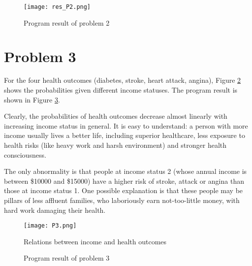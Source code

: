 \documentclass[12pt]{article}
\begin{document}
\begin{figure}[H]
    \centering
    \texttt{[image: res\_P2.png]}
    \caption{Program result of problem 2}
    \label{res_P2}
\end{figure}

\section{Problem 3}
For the four health outcomes (diabetes, stroke, heart attack, angina), Figure \ref{P3_figure} shows the probabilities given different income statuses. The program result is shown in Figure \ref{res_P3}.\par
Clearly, the probabilities of health outcomes decrease almost linearly with increasing income status in general. It is easy to understand: a person with more income usually lives a better life, including superior healthcare, less exposure to health risks (like heavy work and harsh environment) and stronger health consciousness.\par
The only abnormality is that people at income status 2 (whose annual income is between \$10000 and \$15000) have a higher risk of stroke, attack or angina than those at income status 1. One possible explanation is that these people may be pillars of less affluent families, who laboriously earn not-too-little money, with hard work damaging their health.
\begin{figure}
    \centering
    \texttt{[image: P3.png]}
    \caption{Relations between income and health outcomes}
    \label{P3_figure}
\end{figure}
\begin{figure}
    \centering
    \hspace{3pt}
    \caption{\label{res_P3}Program result of problem 3}
\end{figure}
\end{document}
